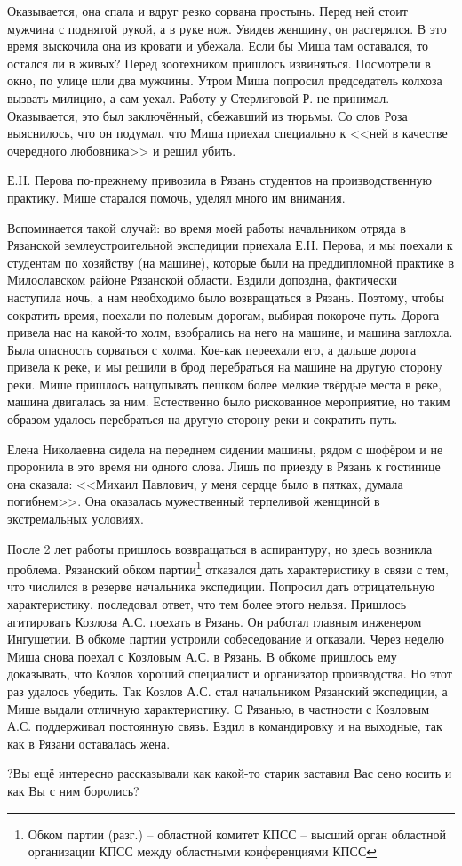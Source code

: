 Оказывается, она спала и вдруг резко сорвана простынь. Перед ней стоит мужчина с поднятой рукой, а в руке нож. Увидев женщину, он растерялся. В это время выскочила она из кровати и убежала. Если бы Миша там оставался, то остался ли в живых? Перед зоотехником пришлось извиняться. Посмотрели в окно, по улице шли два мужчины. Утром Миша попросил председатель колхоза вызвать милицию, а сам уехал. Работу у Стерлиговой Р. не принимал. Оказывается, это был заключённый, сбежавший из тюрьмы. Со слов Роза выяснилось, что он подумал, что Миша приехал специально к <<ней в качестве очередного любовника>> и решил убить.

Е.Н. Перова по-прежнему привозила в Рязань студентов на производственную практику. Мише старался помочь, уделял много им внимания.

Вспоминается такой случай: во время моей работы начальником отряда в Рязанской землеустроительной экспедиции приехала Е.Н. Перова, и мы поехали к студентам по хозяйству (на машине), которые были на преддипломной практике в Милославском районе Рязанской области. Ездили допоздна, фактически наступила ночь, а нам необходимо было возвращаться в Рязань. Поэтому, чтобы сократить время, поехали по полевым дорогам, выбирая покороче путь. Дорога привела нас на какой-то холм, взобрались на него на машине, и машина заглохла. Была опасность сорваться с холма. Кое-как переехали его, а дальше дорога привела к реке, и мы решили в брод перебраться на машине на другую сторону реки. Мише пришлось нащупывать пешком более мелкие твёрдые места в реке, машина двигалась за ним. Естественно было рискованное мероприятие, но таким образом удалось перебраться на другую сторону реки и сократить путь. 

Елена Николаевна сидела на переднем сидении машины, рядом с шофёром и не проронила в это время ни одного слова. Лишь по приезду в Рязань к гостинице она сказала: <<Михаил Павлович, у меня сердце было в пятках, думала погибнем>>. Она оказалась мужественный терпеливой женщиной в экстремальных условиях.

После 2 лет работы пришлось возвращаться в аспирантуру, но здесь возникла проблема. Рязанский обком партии\footnote{Обком партии (разг.) \--- областной комитет КПСС \--- высший орган областной организации КПСС между областными конференциями КПСС} отказался дать характеристику в связи с тем, что числился в резерве начальника экспедиции. Попросил дать отрицательную характеристику. последовал ответ, что тем более этого нельзя. Пришлось агитировать Козлова А.С. поехать в Рязань. Он работал главным инженером Ингушетии. В обкоме партии устроили собеседование и отказали. Через неделю Миша снова поехал с Козловым А.С. в Рязань. В обкоме пришлось ему доказывать, что Козлов хороший специалист и организатор производства. Но этот раз удалось убедить. Так Козлов А.С. стал начальником Рязанский экспедиции, а Мише выдали отличную характеристику. С Рязанью, в частности с Козловым А.С. поддерживал постоянную связь. Ездил в командировку и на выходные, так как в Рязани оставалась жена.

?Вы ещё интересно рассказывали как какой-то старик заставил Вас сено косить и как Вы с ним боролись?